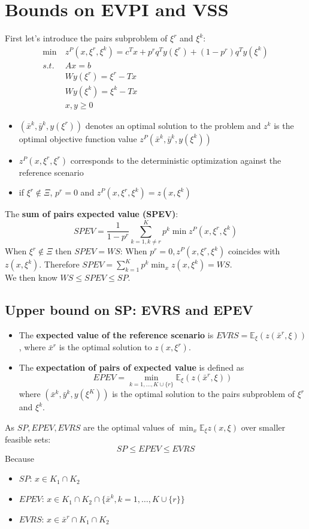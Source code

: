 \documentclass[12pt, openany]{report}
\newcommand{\E}{\mathbb{E}}
\theoremstyle{definition}
\begin{document}
\section{Bounds on EVPI and VSS}
First let's introduce the pairs subproblem of $\xi^r$ and $\xi^k$:
\begin{equation}
	\begin{aligned}
		\min \: &z^P (x, \xi^r,\xi^k) = c^Tx + p^rq^Ty(\xi^r) + (1-p^r)q^Ty(\xi^k)\\
		s.t. \: &Ax = b\\
		&Wy(\xi^r) = \xi^r-Tx\\
		&Wy(\xi^k) = \xi^k-Tx\\
		&x,y\geq0
	\end{aligned}
\end{equation}
\begin{itemize}
	\item $(\bar{x}^k , \bar{y}^k , y(\xi^r ))$ denotes an optimal solution to the problem and $z^k$ is the optimal objective function value $z^P (\bar{x}^k , \bar{y}^k , y(\xi^k ))$
	\item $z^P (x, \xi^r , \xi^r)$ corresponds to the deterministic optimization against the
	reference scenario
	\item if $\xi^r \notin \Xi$, $p^r = 0$ and $z^P (x, \xi^r , \xi^k ) = z(x, \xi^k )$
\end{itemize}
The \textbf{sum of pairs expected value (SPEV)}:
\begin{equation}
	SPEV = \frac{1}{1-p^r} \sum_{k=1,k \neq r}^{K} p^k \min z^P(x, \xi^r,\xi^k)
\end{equation}
When $\xi^r \notin \Xi$ then $SPEV = WS$: When $p^r = 0, z^P(x,\xi^r,\xi^k)$ coincides with $z(x,\xi^k)$. Therefore $SPEV = \sum_{k=1}^{K} p^k \min_x z(x,\xi^k) = WS$.\\
We then know $WS \leq SPEV \leq SP$.
\subsection{Upper bound on SP: EVRS and EPEV}
\begin{itemize}
	\item The \textbf{expected value of the reference scenario} is $EVRS =  \E_\xi(z(\bar{x}^r,\xi))$, where $\bar{x}^r$ is the optimal solution to $z(x,\xi^r)$.
	\item The \textbf{expectation of pairs of expected value} is defined as \[EPEV = \min_{k=1,\dots,K\cup\{r\}}\E_\xi(z(\bar{x}^r,\xi))\] where $(\bar{x}^k,\bar{y}^k, y(\xi^K))$ is the optimal solution to the pairs subproblem of $\xi^r$ and $\xi^k$.
\end{itemize}
As $SP,EPEV,EVRS$ are the optimal values of $\min_x \E_\xi z(x,\xi)$ over smaller feasible sets:
\begin{equation}
	SP \leq EPEV \leq EVRS
\end{equation}
Because
\begin{itemize}
	\item $SP$: $x \in K_1 \cap K_2$
	\item $EPEV$: $x \in K_1 \cap K_2 \cap \{\bar{x}^k,k=1,\dots,K\cup\{r\}\}$
	\item $EVRS$: $x \in \bar{x}^r \cap K_1 \cap K_2$
\end{itemize}
\end{document}
